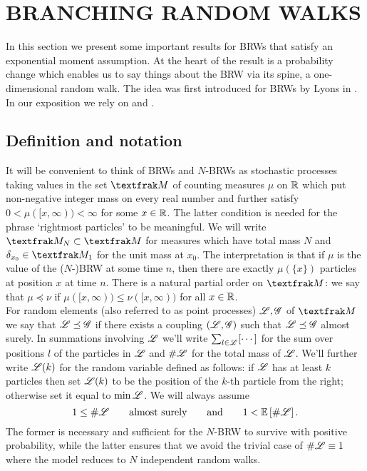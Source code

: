 \section{BRANCHING RANDOM WALKS}\label{sec:BRW_THEORY}

In this section we present some important results for BRWs that satisfy an exponential moment assumption. At the heart of the result is a probability change which enables us to say things about the BRW via its spine, a one-dimensional random walk. The idea was first introduced for BRWs by Lyons in \cite{lyons1997simple}. In our exposition we rely on \cite{mallein2018n} and \cite[Section 4.7]{shi2015branching}. 

\subsection{Definition and notation}
It will be convenient to think of BRWs and $N$-BRWs as stochastic processes taking values in the set $\frak{M}$ of counting measures $\mu$ on $\mathbb{R}$ which put non-negative integer mass on every real number and further satisfy $0 < \mu([x, \infty)) < \infty$ for some $x \in \mathbb{R}$. The latter condition is needed for the phrase `rightmost particles' to be meaningful. We will write $\frak{M}_N \subset \frak{M}$ for measures which have total mass $N$ and $\delta_{x_0} \in \frak{M}_1$ for the unit mass at $x_0$. The interpretation is that if $\mu$ is the value of the ($N$-)BRW at some time $n$, then there are exactly $\mu(\{x\})$ particles at position $x$ at time $n$. There is a natural partial order on $\frak{M}$: we say that $\mu \preceq \nu$ if $\mu([x, \infty)) \leq \nu([x, \infty))$ for all $x \in \mathbb{R}$. \\


For random elements (also referred to as point processes) $\mathscr{L}, \mathscr{G}$ of $\frak{M}$ we say that $\mathscr{L} \preceq \mathscr{G}$ if there exists a coupling $(\mathscr{L}, \mathscr{G})$ such that $\mathscr{L} \preceq \mathscr{G}$ almost surely. In summations involving $\mathscr{L}$ we'll write $\sum_{l \in \mathscr{L}} [\cdots]$ for the sum over positions $l$ of the particles in $\mathscr{L}$ and $\#\mathscr{L}$ for the total mass of $\mathscr{L}$. We'll further write $\mathscr{L}(k)$ for the random variable defined as follows: if $\mathscr{L}$ has at least $k$ particles then set $\mathscr{L}(k)$ to be the position of the $k$-th particle from the right; otherwise set it equal to $\min \mathscr{L}$. We will always assume 
\begin{equation}\label{eqn:TreeAssumptions}
1 \leq \# \mathscr{L} \qquad \text{almost surely} \qquad\text{and}\qquad 1 < \mathbb{E}\left[ \# \mathscr{L} \right]. 
\end{equation}
The former is necessary and sufficient for the $N$-BRW to survive with positive probability, while the latter ensures that we avoid the trivial case of $\# \mathscr{L} \equiv 1$ where the model reduces to $N$ independent random walks. \\

